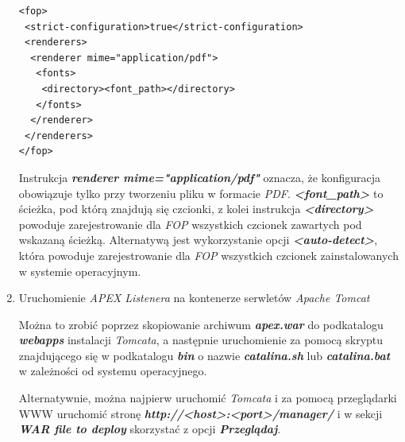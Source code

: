 \documentclass[11pt,a4paper]{article}
\begin{document}
\begin{enumerate}
\lstset{language=XML}
\begin{lstlisting}[frame=single,caption=Konfiguracja czcionek dla \emph{FOP},label=app:fop_font]
<fop>
 <strict-configuration>true</strict-configuration>
 <renderers>
  <renderer mime="application/pdf">
   <fonts>
    <directory><font_path></directory>
   </fonts>
  </renderer>
 </renderers>
</fop>
\end{lstlisting}

Instrukcja \emph{\textbf{renderer mime="application/pdf"}} oznacza, że konfiguracja obowiązuje tylko przy tworzeniu pliku w formacie \emph{PDF}. \emph{\textbf{\textless font\_path\textgreater}} to ścieżka, pod którą znajdują się czcionki, z kolei instrukcja \emph{\textbf{\textless directory\textgreater}} powoduje zarejestrowanie dla \emph{FOP} wszystkich czcionek zawartych pod wskazaną ścieżką. Alternatywą jest wykorzystanie opcji \emph{\textbf{\textless auto-detect\textgreater}}, która powoduje zarejestrowanie dla \emph{FOP} wszystkich czcionek zainstalowanych w systemie operacyjnym.

\item Uruchomienie \emph{APEX Listenera} na kontenerze serwletów \emph{Apache Tomcat}

Można to zrobić poprzez skopiowanie archiwum \textbf{\emph{apex.war}} do podkatalogu \textbf{\emph{webapps}} instalacji \emph{Tomcata}, a następnie uruchomienie za pomocą skryptu znajdującego się w podkatalogu \textbf{\emph{bin}} o nazwie \textbf{\emph{catalina.sh}} lub \textbf{\emph{catalina.bat}} w zależności od systemu operacyjnego.

Alternatywnie, można najpierw uruchomić \emph{Tomcata} i za pomocą przeglądarki WWW uruchomić stronę \textbf{\emph{http://\textless host\textgreater :\textless port\textgreater/manager/}} i w sekcji \emph{\textbf{WAR file to deploy}} skorzystać z opcji \emph{\textbf{Przeglądaj}}.

\end{enumerate}
\newpage

\end{document}
